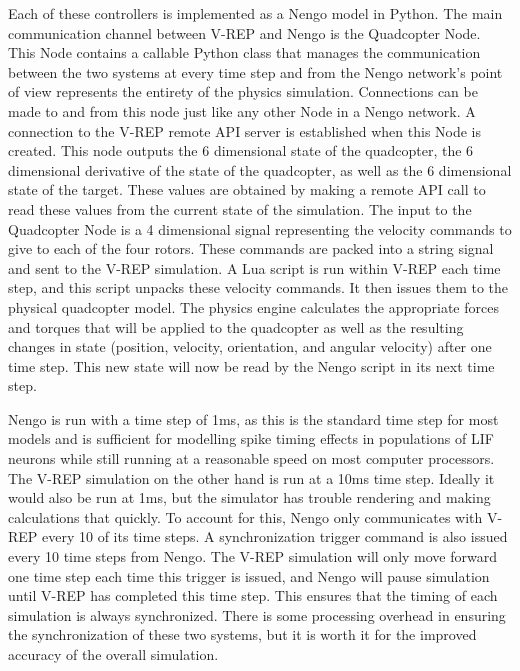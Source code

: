 \documentclass[letterpaper,12pt,titlepage,oneside,final]{book}
\begin{document}
Each of these controllers is implemented as a Nengo model in Python. 
The main communication channel between V-REP and Nengo is the Quadcopter Node. 
This Node contains a callable Python class that manages the communication between the two systems at every time step and from the Nengo network’s point of view represents the entirety of the physics simulation. 
Connections can be made to and from this node just like any other Node in a Nengo network. 
A connection to the V-REP remote API server is established when this Node is created. 
This node outputs the 6 dimensional state of the quadcopter, the 6 dimensional derivative of the state of the quadcopter, as well as the 6 dimensional state of the target. 
These values are obtained by making a remote API call to read these values from the current state of the simulation. The input to the Quadcopter Node is a 4 dimensional signal representing the velocity commands to give to each of the four rotors. 
These commands are packed into a string signal and sent to the V-REP simulation. 
A Lua script is run within V-REP each time step, and this script unpacks these velocity commands. 
It then issues them to the physical quadcopter model. The physics engine calculates the appropriate forces and torques that will be applied to the quadcopter as well as the resulting changes in state (position, velocity, orientation, and angular velocity) after one time step. 
This new state will now be read by the Nengo script in its next time step.

Nengo is run with a time step of 1ms, as this is the standard time step for most models and is sufficient for modelling spike timing effects in populations of LIF neurons while still running at a reasonable speed on most computer processors. 
The V-REP simulation on the other hand is run at a 10ms time step. 
Ideally it would also be run at 1ms, but the simulator has trouble rendering and making calculations that quickly. 
To account for this, Nengo only communicates with V-REP every 10 of its time steps. 
A synchronization trigger command is also issued every 10 time steps from Nengo. The V-REP simulation will only move forward one time step each time this trigger is issued, and Nengo will pause simulation until V-REP has completed this time step. 
This ensures that the timing of each simulation is always synchronized. 
There is some processing overhead in ensuring the synchronization of these two systems, but it is worth it for the improved accuracy of the overall simulation. 

\end{document}

